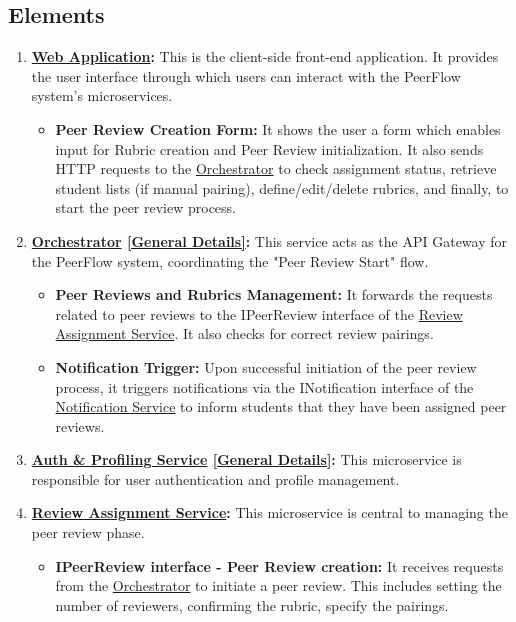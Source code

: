 \subsection{Elements}

\begin{enumerate}
    \item \textbf{\hyperref[def:WebApplication]{Web Application}:} This is the client-side front-end application. It provides the user interface through which users can interact with the PeerFlow system’s microservices.
    \begin{itemize}
        \item \textbf{Peer Review Creation Form:} It shows the user a form which enables input for Rubric creation and Peer Review initialization. It also sends HTTP requests to the \hyperref[def:Orchestrator]{Orchestrator} to check assignment status, retrieve student lists (if manual pairing), define/edit/delete rubrics, and finally, to start the peer review process.
    \end{itemize}
    \item \textbf{\hyperref[def:Orchestrator]{Orchestrator} \hyperref[def:GenDetailsOrchestrator]{[General Details]}:} This service acts as the API Gateway for the PeerFlow system, coordinating the "Peer Review Start" flow.
    \begin{itemize}
        \item \textbf{Peer Reviews and Rubrics Management:} It forwards the requests related to peer reviews to the IPeerReview interface of the \hyperref[def:ReviewAssignmentService]{Review Assignment Service}. It also checks for correct review pairings.
        \item \textbf{Notification Trigger:} Upon successful initiation of the peer review process, it triggers notifications via the INotification interface of the \hyperref[def:NotificationService]{Notification Service} to inform students that they have been assigned peer reviews.
    \end{itemize}
    \item \textbf{\hyperref[def:AuthProfilingService]{Auth \& Profiling Service} \hyperref[def:GenDetailsAuth]{[General Details]}:} This microservice is responsible for user authentication and profile management.
    
    \item \textbf{\hyperref[def:ReviewAssignmentService]{Review Assignment Service}:} This microservice is central to managing the peer review phase.
    \begin{itemize}
        \item \textbf{IPeerReview interface - Peer Review creation:} It receives requests from the \hyperref[def:Orchestrator]{Orchestrator} to initiate a peer review. This includes setting the number of reviewers, confirming the rubric, specify the pairings.


\end{itemize}
\end{enumerate}
